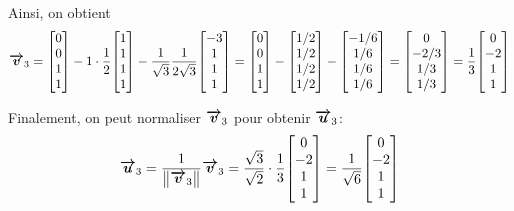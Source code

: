 \documentclass[a4paper]{article}
\begin{document}
{    Ainsi, on obtient 
    \[\bvec{v}_3 = \begin{bmatrix} 0 \\ 0 \\ 1 \\ 1 \end{bmatrix} - 1\cdot \frac{1}{2} \begin{bmatrix} 1 \\ 1 \\ 1 \\ 1 \end{bmatrix} - \frac{1}{\sqrt{3}} \frac{1}{2\sqrt{3}} \begin{bmatrix} -3 \\ 1 \\ 1 \\ 1 \end{bmatrix} = \begin{bmatrix} 0 \\ 0 \\ 1 \\ 1 \end{bmatrix} - \begin{bmatrix} 1 / 2 \\ 1 / 2 \\ 1 / 2 \\ 1 / 2 \end{bmatrix}  - \begin{bmatrix} -1 / 6 \\ 1 / 6 \\ 1 / 6 \\ 1 / 6 \end{bmatrix} = \begin{bmatrix} 0 \\ -2 / 3 \\ 1 / 3 \\ 1 / 3 \end{bmatrix} = \frac{1}{3} \begin{bmatrix} 0 \\ -2 \\ 1 \\ 1 \end{bmatrix} \]
    
    Finalement, on peut normaliser $\bm{\protect\overrightarrow{v}}_3$ pour obtenir $\bm{\protect\overrightarrow{u}}_3$: 
    \[\bvec{u}_3 = \frac{1}{\left\|\bvec{v}_3\right\|} \bvec{v}_3 = \frac{\sqrt{3}}{\sqrt{2}} \cdot \frac{1}{3} \begin{bmatrix} 0 \\ -2 \\ 1 \\ 1 \end{bmatrix} = \frac{1}{\sqrt{6}} \begin{bmatrix} 0 \\ -2 \\ 1 \\ 1 \end{bmatrix} \]

}
\end{document}
